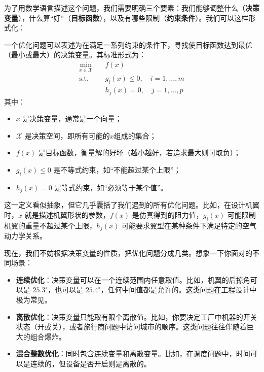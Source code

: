 \documentclass[lang=cn,zihao=-4,a4paper,fontset=windows]{beautybook}
\begin{document}
为了用数学语言描述这个问题，我们需要明确三个要素：我们能够调整什么（\textbf{决策变量}），什么算“好”（\textbf{目标函数}），以及有哪些限制（\textbf{约束条件}）。我们可以这样形式化：

\begin{definition}[][优化问题的一般形式]
一个优化问题可以表述为在满足一系列约束的条件下，寻找使目标函数达到最优（最小或最大）的决策变量。其标准形式为：
\[
\begin{aligned}
\min_{x \in \mathcal{X}} &\quad f(x) \\
\text{s.t.} &\quad g_i(x) \leq 0, \quad i = 1, \dots, m \\
&\quad h_j(x) = 0, \quad j = 1, \dots, p
\end{aligned}
\]
其中：
\begin{itemize}
    \item $x$ 是决策变量，通常是一个向量；
    \item $\mathcal{X}$ 是决策空间，即所有可能的$x$组成的集合；
    \item $f(x)$ 是目标函数，衡量解的好坏（越小越好，若追求最大则可取负）；
    \item $g_i(x) \leq 0$ 是不等式约束，如“不能超过某个上限”；
    \item $h_j(x) = 0$ 是等式约束，如“必须等于某个值”。
\end{itemize}
\end{definition}

这一定义看似抽象，但它几乎囊括了我们遇到的所有优化问题。比如，在设计机翼时，$x$ 就是描述机翼形状的参数，$f(x)$ 是仿真得到的阻力值，$g_i(x)$ 可能限制机翼的重量不超过某个上限，$h_j(x)$ 可能要求翼型在某种条件下满足特定的空气动力学关系。

现在，我们不妨根据决策变量的性质，把优化问题分成几类。想象一下你面对的不同场景：

\begin{itemize}
    \item \textbf{连续优化}：决策变量可以在一个连续范围内任意取值。比如，机翼的后掠角可以是 $25.3^\circ$，也可以是 $25.4^\circ$，任何中间值都是允许的。这类问题在工程设计中极为常见。
    \item \textbf{离散优化}：决策变量只能取有限个离散值。比如，你要决定工厂中机器的开关状态（开或关），或者旅行商问题中访问城市的顺序。这类问题往往伴随着巨大的组合爆炸。
    \item \textbf{混合整数优化}：同时包含连续变量和离散变量。比如，在调度问题中，时间可以是连续的，但设备是否开启则是离散的。
\end{itemize}
\end{document}
